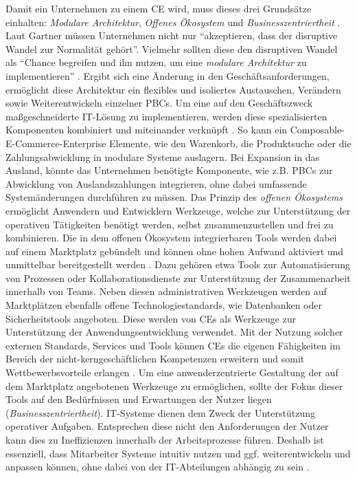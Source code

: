 Damit ein Unternehmen zu einem \ac{CE} wird, muss dieses drei Grundsätze einhalten: \textit{Modulare Architektur}, \textit{Offenes Ökosystem} und \textit{Businesszentriertheit} \cite{.20230313}. Laut Gartner müssen Unternehmen nicht nur \enquote{akzeptieren, dass der disruptive Wandel zur Normalität gehört}. Vielmehr sollten diese den disruptiven Wandel als \enquote{Chance begreifen und ihn nutzen, um eine \textit{modulare Architektur} zu implementieren} \cite{.20230313}. Ergibt sich eine Änderung in den Geschäftsanforderungen, ermöglicht diese Architektur ein flexibles und isoliertes Austauschen, Verändern sowie Weiterentwickeln einzelner PBCs. Um eine auf den Geschäftszweck maßgeschneiderte IT-Lösung zu implementieren, werden diese spezialisierten Komponenten kombiniert und miteinander verknüpft \cite[315]{Chang.1019202010232020}. So kann ein Composable-E-Commerce-Enterprise Elemente, wie den Warenkorb, die Produktsuche oder die Zahlungsabwicklung in modulare Systeme auslagern. Bei Expansion in das Ausland, könnte das Unternehmen benötigte Komponente, wie z.B. PBCs zur Abwicklung von Auslandszahlungen integrieren, ohne dabei umfassende Systemänderungen durchführen zu müssen. Das Prinzip des \textit{offenen Ökosystems} ermöglicht Anwendern und Entwicklern Werkzeuge, welche zur Unterstützung der operativen Tätigkeiten benötigt werden, selbst zusammenzustellen und frei zu kombinieren. Die in dem offenen Ökosystem integrierbaren Tools werden dabei auf einem Marktplatz gebündelt und können ohne hohen Aufwand aktiviert und unmittelbar bereitgestellt werden \cite[58]{.2009}. Dazu gehören etwa Tools zur Automatisierung von Prozessen oder Kollaborationsdienste zur Unterstützung der Zusammenarbeit innerhalb von Teams. Neben diesen administrativen Werkzeugen werden auf Marktplätzen ebenfalls offene Technologiestandards, wie Datenbanken oder Sicherheitstools angeboten. Diese werden von CEs als Werkzeuge zur Unterstützung der Anwendungsentwicklung verwendet. Mit der Nutzung solcher externen Standards, Services und Tools können CEs die eigenen Fähigkeiten im Bereich der nicht-kerngeschäftlichen Kompetenzen erweitern und somit Wettbewerbsvorteile erlangen \cite[7]{Sensedia.2020}. Um eine anwenderzentrierte Gestaltung der auf dem Marktplatz angebotenen Werkzeuge zu ermöglichen, sollte der Fokus dieser Tools auf den Bedürfnissen und Erwartungen der Nutzer liegen (\textit{Businesszentriertheit}). IT-Systeme dienen dem Zweck der Unterstützung operativer Aufgaben. Entsprechen diese nicht den Anforderungen der Nutzer kann dies zu Ineffizienzen innerhalb der Arbeitsprozesse führen. Deshalb ist essenziell, dass Mitarbeiter Systeme intuitiv nutzen und ggf. weiterentwickeln und anpassen können, ohne dabei von der IT-Abteilungen abhängig zu sein \cite{.20230313}. 

